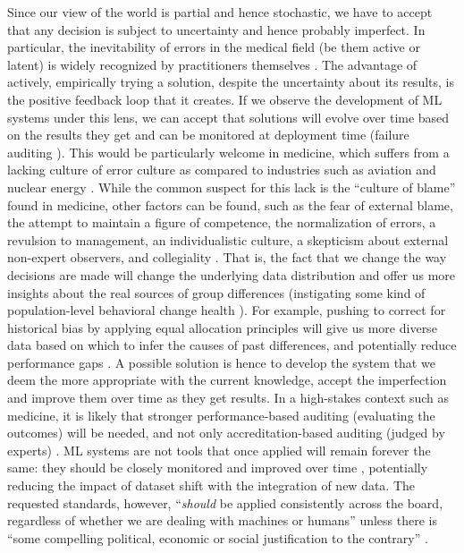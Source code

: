    Since our view of the world is partial and hence stochastic, we have to accept that any decision is subject to uncertainty and hence probably imperfect.
    In particular, the inevitability of errors in the medical field (be them active or latent) is widely recognized by practitioners themselves \cite{Waring2005}.
    The advantage of actively, empirically trying a solution, despite the uncertainty about its results, is the positive feedback loop that it creates.
    If we observe the development of ML systems under this lens, we can accept that solutions will evolve over time based on the results they get and can be monitored at deployment time (failure auditing \cite{Chen2021}).
    This would be particularly welcome in medicine, which suffers from a lacking culture of error culture as compared to industries such as aviation and nuclear energy \cite{Waring2005}.
    While the common suspect for this lack is the ``culture of blame'' found in medicine, other factors can be found, such as the fear of external blame, the attempt to maintain a figure of competence, the normalization of errors, a revulsion to management, an individualistic culture, a skepticism about external non-expert observers, and collegiality \cite{Waring2005}.
    That is, the fact that we change the way decisions are made will change the underlying data distribution and offer us more insights about the real sources of group differences (instigating some kind of population-level behavioral change health \cite{Morley2020}).
    For example, pushing to correct for historical bias by applying equal allocation principles \cite{Rajkomar2018} will give us more diverse data based on which to infer the causes of past differences, and potentially reduce performance gaps \cite{Chen2021}.
    A possible solution is hence to develop the system that we deem the more appropriate with the current knowledge, accept the imperfection and improve them over time as they get results.
    In a high-stakes context such as medicine, it is likely that stronger performance-based auditing (evaluating the outcomes) will be needed, and not only accreditation-based auditing (judged by experts) \cite{Zerilli2019}.
    ML systems are not tools that once applied will remain forever the same: they should be closely monitored and improved over time \cite{Rajkomar2018}, potentially reducing the impact of dataset shift with the integration of new data.
    The requested standards, however, ``\emph{should} be applied consistently across the board, regardless of whether we are dealing with machines or humans'' unless there is ``some compelling political, economic or social justification to the contrary'' \cite[p.~678]{Zerilli2019}.
